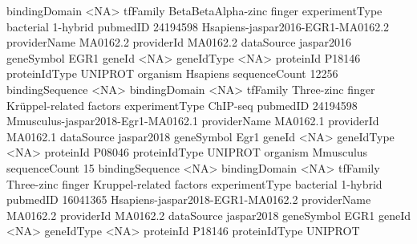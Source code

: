 \documentclass{article}
\renewenvironment{Schunk}{\vspace{\topsep}}{\vspace{\topsep}}
\begin{document}
\begin{Schunk}
\begin{Soutput}
bindingDomain   <NA>                              
tfFamily        BetaBetaAlpha-zinc finger         
experimentType  bacterial 1-hybrid                
pubmedID        24194598                          
                Hsapiens-jaspar2016-EGR1-MA0162.2        
providerName    MA0162.2                                 
providerId      MA0162.2                                 
dataSource      jaspar2016                               
geneSymbol      EGR1                                     
geneId          <NA>                                     
geneIdType      <NA>                                     
proteinId       P18146                                   
proteinIdType   UNIPROT                                  
organism        Hsapiens                                 
sequenceCount   12256                                    
bindingSequence <NA>                                     
bindingDomain   <NA>                                     
tfFamily        Three-zinc finger Krüppel-related factors
experimentType  ChIP-seq                                 
pubmedID        24194598                                 
                Mmusculus-jaspar2018-Egr1-MA0162.1        
providerName    MA0162.1                                  
providerId      MA0162.1                                  
dataSource      jaspar2018                                
geneSymbol      Egr1                                      
geneId          <NA>                                      
geneIdType      <NA>                                      
proteinId       P08046                                    
proteinIdType   UNIPROT                                   
organism        Mmusculus                                 
sequenceCount   15                                        
bindingSequence <NA>                                      
bindingDomain   <NA>                                      
tfFamily        Three-zinc finger Kruppel-related factors 
experimentType  bacterial 1-hybrid                        
pubmedID        16041365                                  
                Hsapiens-jaspar2018-EGR1-MA0162.2         
providerName    MA0162.2                                  
providerId      MA0162.2                                  
dataSource      jaspar2018                                
geneSymbol      EGR1                                      
geneId          <NA>                                      
geneIdType      <NA>                                      
proteinId       P18146                                    
proteinIdType   UNIPROT                                   

\end{Soutput}
\end{Schunk}
\end{document}
